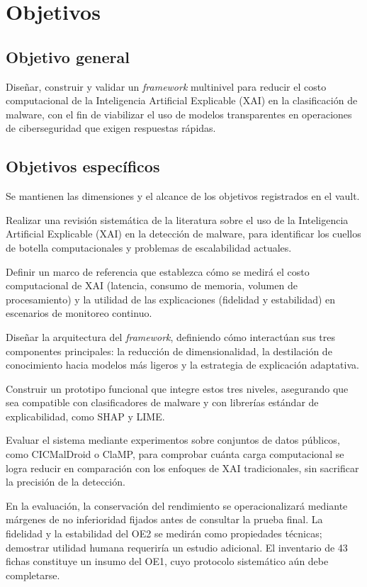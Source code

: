 \chapter{Objetivos}
\section{Objetivo general}
Diseñar, construir y validar un \textit{framework} multinivel para reducir el costo computacional de la Inteligencia Artificial Explicable (XAI) en la clasificación de malware, con el fin de viabilizar el uso de modelos transparentes en operaciones de ciberseguridad que exigen respuestas rápidas.

\section{Objetivos específicos}
Se mantienen las dimensiones y el alcance de los objetivos registrados en el vault.
\begin{description}[style=nextline,leftmargin=1.2cm]
\item[OE1. Estudio] Realizar una revisión sistemática de la literatura sobre el uso de la Inteligencia Artificial Explicable (XAI) en la detección de malware, para identificar los cuellos de botella computacionales y problemas de escalabilidad actuales.
\item[OE2. Estudio] Definir un marco de referencia que establezca cómo se medirá el costo computacional de XAI (latencia, consumo de memoria, volumen de procesamiento) y la utilidad de las explicaciones (fidelidad y estabilidad) en escenarios de monitoreo continuo.
\item[OE3. Desarrollo] Diseñar la arquitectura del \textit{framework}, definiendo cómo interactúan sus tres componentes principales: la reducción de dimensionalidad, la destilación de conocimiento hacia modelos más ligeros y la estrategia de explicación adaptativa.
\item[OE4. Desarrollo] Construir un prototipo funcional que integre estos tres niveles, asegurando que sea compatible con clasificadores de malware y con librerías estándar de explicabilidad, como SHAP y LIME.
\item[OE5. Validación] Evaluar el sistema mediante experimentos sobre conjuntos de datos públicos, como CICMalDroid o ClaMP, para comprobar cuánta carga computacional se logra reducir en comparación con los enfoques de XAI tradicionales, sin sacrificar la precisión de la detección.
\end{description}

En la evaluación, la conservación del rendimiento se operacionalizará mediante márgenes de no inferioridad fijados antes de consultar la prueba final. La fidelidad y la estabilidad del OE2 se medirán como propiedades técnicas; demostrar utilidad humana requeriría un estudio adicional. El inventario de 43 fichas constituye un insumo del OE1, cuyo protocolo sistemático aún debe completarse.
